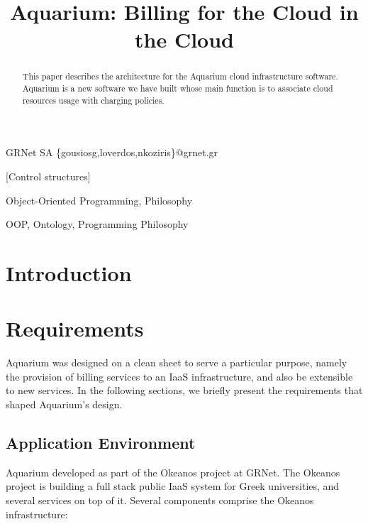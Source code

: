 \documentclass[preprint,10pt]{sigplanconf}
\begin{document}




\title{Aquarium: Billing for the Cloud in the Cloud}

{GRNet SA}
{\{gousiosg,loverdos,nkoziris\}@grnet.gr}

\maketitle
\begin{abstract}
    This paper describes the architecture for the Aquarium cloud infrastructure
    software. Aquarium is a new software we have built whose main function is to associate cloud resources usage with charging policies.
\end{abstract}

[Control structures]

\terms
    Object-Oriented Programming, Philosophy

\keywords
    OOP, Ontology, Programming Philosophy

\section{Introduction}
\section{Requirements}

Aquarium was designed on a clean sheet to serve a particular purpose,
namely the provision of billing services to an IaaS infrastructure,
and also be extensible to new services. In the following sections,
we briefly present the requirements that shaped Aquarium's design.

\subsection{Application Environment}
Aquarium developed as part of the Okeanos project at GRNet. The
Okeanos project is building a full stack public IaaS system for Greek
universities, and several services on top of it. Several components comprise
the Okeanos infrastructure:
\end{document}
